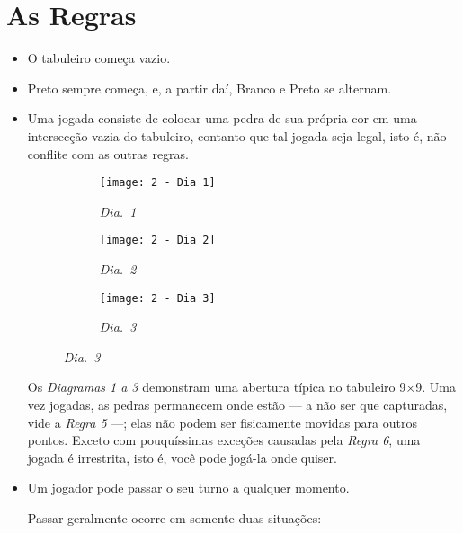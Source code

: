 \chapter{As Regras}\label{chap:regras}

\begin{itemize}
    \item[\textbf{Regra 1}] O tabuleiro começa vazio.
    \item[\textbf{Regra 2}] Preto sempre começa, e, a partir daí, Branco e Preto se alternam. 
    \item[\textbf{Regra 3}] Uma jogada consiste de colocar uma pedra de sua própria cor em uma intersecção vazia do tabuleiro, contanto que tal jogada seja legal, isto é, não conflite com as outras regras.

    \begin{figure}[h]
        \centering
        \begin{subfigure}{.3\textwidth}
            \centering
            \texttt{[image: 2 - Dia 1]}
            \captionsetup{justification=centering}
            \caption*{\emph{Dia.\@~1}}
        \end{subfigure}
        \begin{subfigure}{.3\textwidth}
            \centering
            \texttt{[image: 2 - Dia 2]}
            \captionsetup{justification=centering}
            \caption*{\emph{Dia.\@~2}}
        \end{subfigure}
        \begin{subfigure}{.3\textwidth}
            \centering
            \texttt{[image: 2 - Dia 3]}
            \captionsetup{justification=centering}
            \caption*{\emph{Dia.\@~3}}
        \end{subfigure}
    \end{figure}

    Os \emph{Diagramas 1 a 3} demonstram uma abertura típica no tabuleiro 9\(\times\)9. Uma vez jogadas, as pedras permanecem onde estão --- a não ser que capturadas, vide a \emph{Regra 5} ---; elas não podem ser fisicamente movidas para outros pontos. Exceto com pouquíssimas exceções causadas pela \emph{Regra 6}, uma jogada é irrestrita, isto é, você pode jogá-la onde quiser.

    \item[\textbf{Regra 4}] Um jogador pode passar o seu turno a qualquer momento.
    
    Passar geralmente ocorre em somente duas situações:
        

\end{itemize}
